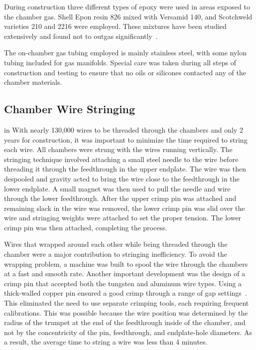 During construction three different types of epoxy were used in areas exposed 
to the chamber gas.  Shell Epon resin 826 mixed with Versamid 140, and 
Scotchweld varieties 210 and 2216 were employed.  These mixtures have been 
studied extensively and found not to outgas significantly~\cite{nasa}.

The on-chamber gas tubing employed is mainly stainless steel, with some
nylon tubing included for gas manifolds.  Special care was taken during
all steps of construction and testing to ensure that no oils or
silicones contacted any of the chamber materials.

\subsection{Chamber Wire Stringing}

 in
With nearly 130,000 wires to be threaded through the chambers and only 2 years 
for construction, it was important to minimize the time required to string 
each wire.  All chambers were strung with 
the wires running vertically.  The stringing technique involved attaching a 
small steel needle to the wire before threading it through the feedthrough in 
the upper endplate.  The wire was then despooled and gravity acted to bring the 
wire close to the feedthrough in the lower endplate.  A small magnet was then 
used to pull the needle and wire through the lower feedthrough.  After the upper 
crimp pin was attached and remaining slack in the wire was removed, the lower 
crimp pin was slid over the wire and stringing weights were attached to set the 
proper tension.  The lower crimp pin was then attached, completing the process.
  
Wires that wrapped around each other while being threaded through the chamber 
were a major contribution to stringing inefficiency. To avoid the wrapping
problem, a machine was built to spool the wire through the chambers at a fast 
and smooth rate.  Another important development was the design of a crimp pin 
that accepted both the tungsten and aluminum wire types.  Using a thick-walled 
copper pin ensured a good crimp through a range of gap settings~\cite{sbc}.  This 
eliminated the need to use separate crimping tools, each requiring frequent 
calibrations.  This was possible because the wire position was determined by the 
radius of the trumpet at the end of the feedthrough inside of the chamber, and 
not by the concentricity of the pin, feedthrough, and endplate-hole diameters. 
As a result, the average time to string a wire was less than 4 minutes.










